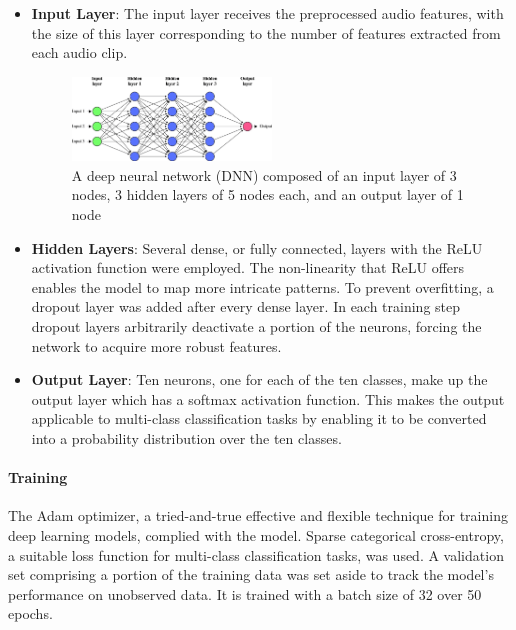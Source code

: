 \documentclass[conference]{IEEEtran}
\begin{document}
\begin{itemize}
    \item \textbf{Input Layer}: The input layer receives the preprocessed audio features, with the size of this layer corresponding to the number of features extracted from each audio clip.
    \begin{figure}[htbp]
\centerline{\includegraphics[width=0.5\textwidth]{Images/DNNsamplearchitect.png}}
\caption{A deep neural network (DNN) composed of an input layer of 3 nodes, 3 hidden layers of 5 nodes each, and an output layer of 1 node \cite{DNNsample}}
\label{fig:DNN Sample}
\end{figure}
    \item \textbf{Hidden Layers}: Several dense, or fully connected, layers with the ReLU activation function were employed. The non-linearity that ReLU offers enables the model to map more intricate patterns. To prevent overfitting, a dropout layer was added after every dense layer. In each training step dropout layers arbitrarily deactivate a portion of the neurons, forcing the network to acquire more robust features.

    
    \item \textbf{Output Layer}: Ten neurons, one for each of the ten classes, make up the output layer which has a softmax activation function. This makes the output applicable to multi-class classification tasks by enabling it to be converted into a probability distribution over the ten classes.

\end{itemize}

\paragraph{Training}
The Adam optimizer, a tried-and-true effective and flexible technique for training deep learning models, complied with the model. Sparse categorical cross-entropy, a suitable loss function for multi-class classification tasks, was used. A validation set comprising a portion of the training data was set aside to track the model's performance on unobserved data. It is trained with a batch size of 32 over 50 epochs.
\end{document}
